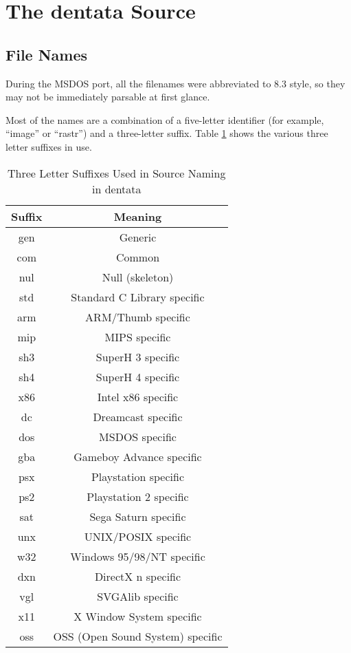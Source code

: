 %
% 
% 
\def\FileCreated{Sat Jun 23 00:06:03 2001}
\def\FileRevised{Sat Jun 23 04:10:44 2001}

\section{The dentata Source}

\subsection{File Names}

During the MSDOS port, all the filenames were abbreviated to
8.3 style, so they may not be immediately parsable at first
glance.

Most of the names are a combination of a five-letter identifier
(for example, ``image'' or ``rastr'') and a three-letter suffix.
Table \ref{tab:tlsuffixes} shows the various three letter suffixes
in use.

\begin{table}[hpt]
\caption{Three Letter Suffixes Used in Source Naming in dentata}
\label{tab:tlsuffixes}
\begin{tabular}{|c|c|}
\hline
Suffix & Meaning \\
\hline\hline
gen & Generic \\
com & Common \\
nul & Null (skeleton) \\
std & Standard C Library specific \\
\hline\hline
arm & ARM/Thumb specific \\
mip & MIPS specific \\
sh3 & SuperH 3 specific \\
sh4 & SuperH 4 specific \\
x86 & Intel x86 specific \\
\hline\hline
dc & Dreamcast specific \\
dos & MSDOS specific \\
gba & Gameboy Advance specific \\
psx & Playstation specific \\
ps2 & Playstation 2 specific \\
sat & Sega Saturn specific \\
unx & UNIX/POSIX specific \\
w32 & Windows 95/98/NT specific \\
\hline\hline
dxn & DirectX n specific \\
vgl & SVGAlib specific \\
x11 & X Window System specific \\
oss & OSS (Open Sound System) specific \\
\hline
\end{tabular}

\end{table}